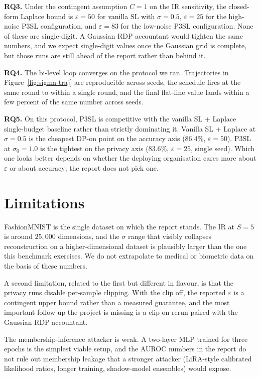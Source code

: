 \documentclass[11pt,a4paper,oneside]{report}
\begin{document}
\textbf{RQ3.} Under the contingent assumption $C{=}1$ on the IR
sensitivity, the closed-form Laplace bound is $\varepsilon = 50$ for
vanilla SL with $\sigma{=}0.5$, $\varepsilon = 25$ for the
high-noise P3SL configuration, and $\varepsilon = 83$ for the
low-noise P3SL configuration. None of these are single-digit.
A Gaussian RDP accountant would tighten the same numbers, and we
expect single-digit values once the Gaussian grid is complete, but
those runs are still ahead of the report rather than behind it.

\textbf{RQ4.} The bi-level loop converges on the protocol we ran.
Trajectories in Figure~\ref{fig:sigma-traj} are reproducible across
seeds, the schedule fires at the same round to within a single
round, and the final flat-line value lands within a few percent of
the same number across seeds.

\textbf{RQ5.} On this protocol, P3SL is competitive with the vanilla
SL + Laplace single-budget baseline rather than strictly dominating
it. Vanilla SL + Laplace at $\sigma{=}0.5$ is the cheapest DP-on
point on the accuracy axis ($86.4\%$, $\varepsilon = 50$). P3SL at
$\sigma_0{=}1.0$ is the tightest on the privacy axis ($83.6\%$,
$\varepsilon = 25$, single seed). Which one looks better depends on
whether the deploying organisation cares more about $\varepsilon$
or about accuracy; the report does not pick one.

\section{Limitations}

FashionMNIST is the single dataset on which the report stands. The
IR at $S{=}5$ is around $25{,}000$ dimensions, and the $\sigma$
range that visibly collapses reconstruction on a higher-dimensional
dataset is plausibly larger than the one this benchmark exercises.
We do not extrapolate to medical or biometric data on the basis of
these numbers.

A second limitation, related to the first but different in flavour,
is that the privacy runs disable per-sample clipping. With the clip
off, the reported $\varepsilon$ is a contingent upper bound rather
than a measured guarantee, and the most important follow-up the
project is missing is a clip-on rerun paired with the Gaussian RDP
accountant.

The membership-inference attacker is weak. A two-layer MLP trained
for three epochs is the simplest viable setup, and the AUROC numbers
in the report do not rule out membership leakage that a stronger
attacker (LiRA-style calibrated likelihood ratios, longer training,
shadow-model ensembles) would expose.
\end{document}
